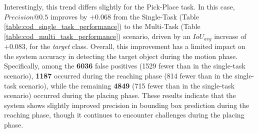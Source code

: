Interestingly, this trend differs slightly for the Pick-Place task. In this case, $Precision@0.5$ improves by $+0.068$ from the Single-Task (Table \ref{table:cod_single_task_performance}) to the Multi-Task (Table \ref{table:cod_multi_task_performance}) scenario, driven by an $IoU_{avg}$ increase of $+0.083$, for the \textit{target} class. Overall, this improvement has a limited impact on the system accuracy in detecting the target object during the motion phase. Specifically, among the \textbf{6036} false positives (1529 fewer than in the single-task scenario), \textbf{1187} occurred during the reaching phase (814 fewer than in the single-task scenario), while the remaining \textbf{4849} (715 fewer than in the single-task scenario) occurred during the placing phase. These results indicate that the system shows slightly improved precision in bounding box prediction during the reaching phase, though it continues to encounter challenges during the placing phase.





